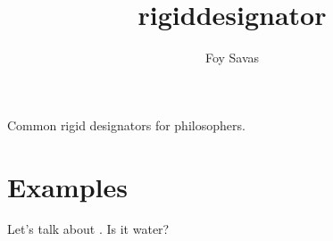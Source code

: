 \documentclass{article}
\title{rigiddesignator}
\author{Foy Savas}
\date{ }
\begin{document}
\maketitle

Common rigid designators for philosophers.

\section{Examples}

Let's talk about . Is it water?
\end{document}
